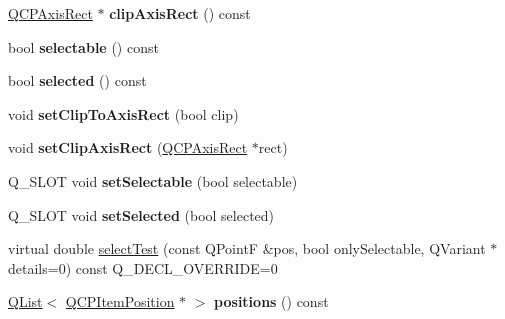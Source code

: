 \begin{DoxyCompactItemize}
\item 
\hyperlink{class_q_c_p_axis_rect}{Q\+C\+P\+Axis\+Rect} $\ast$ {\bfseries clip\+Axis\+Rect} () const \hypertarget{class_q_c_p_abstract_item_aeaecafc8043eb74986e169c7c6899bcf}{}\label{class_q_c_p_abstract_item_aeaecafc8043eb74986e169c7c6899bcf}

\item 
bool {\bfseries selectable} () const \hypertarget{class_q_c_p_abstract_item_a9189e752025533e1595eaade0009a3bc}{}\label{class_q_c_p_abstract_item_a9189e752025533e1595eaade0009a3bc}

\item 
bool {\bfseries selected} () const \hypertarget{class_q_c_p_abstract_item_a225865808640d8d9a7dd19f09a2e93f2}{}\label{class_q_c_p_abstract_item_a225865808640d8d9a7dd19f09a2e93f2}

\item 
void {\bfseries set\+Clip\+To\+Axis\+Rect} (bool clip)\hypertarget{class_q_c_p_abstract_item_a39e05b9d4176b9accafc746d16ca6a06}{}\label{class_q_c_p_abstract_item_a39e05b9d4176b9accafc746d16ca6a06}

\item 
void {\bfseries set\+Clip\+Axis\+Rect} (\hyperlink{class_q_c_p_axis_rect}{Q\+C\+P\+Axis\+Rect} $\ast$rect)\hypertarget{class_q_c_p_abstract_item_a7dc75fcbcd10206fe0b75d757ea7a347}{}\label{class_q_c_p_abstract_item_a7dc75fcbcd10206fe0b75d757ea7a347}

\item 
Q\+\_\+\+S\+L\+OT void {\bfseries set\+Selectable} (bool selectable)\hypertarget{class_q_c_p_abstract_item_ab36e93c24bc9817f08260e34a38a8759}{}\label{class_q_c_p_abstract_item_ab36e93c24bc9817f08260e34a38a8759}

\item 
Q\+\_\+\+S\+L\+OT void {\bfseries set\+Selected} (bool selected)\hypertarget{class_q_c_p_abstract_item_aa3d44aec4395fb95ee00e77dd13d8a39}{}\label{class_q_c_p_abstract_item_aa3d44aec4395fb95ee00e77dd13d8a39}

\item 
virtual double \hyperlink{class_q_c_p_abstract_item_ae41d0349d68bb802c49104afd100ba2a}{select\+Test} (const Q\+PointF \&pos, bool only\+Selectable, Q\+Variant $\ast$details=0) const Q\+\_\+\+D\+E\+C\+L\+\_\+\+O\+V\+E\+R\+R\+I\+DE=0
\item 
\hyperlink{class_q_list}{Q\+List}$<$ \hyperlink{class_q_c_p_item_position}{Q\+C\+P\+Item\+Position} $\ast$ $>$ {\bfseries positions} () const \hypertarget{class_q_c_p_abstract_item_a3f98af85e7cb0856c310da4db30f8337}{}\label{class_q_c_p_abstract_item_a3f98af85e7cb0856c310da4db30f8337}


\end{DoxyCompactItemize}
